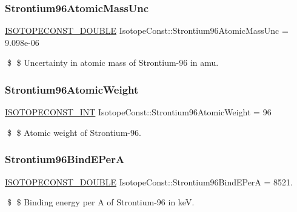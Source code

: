 \subsubsection{\texorpdfstring{Strontium96\+Atomic\+Mass\+Unc}{Strontium96AtomicMassUnc}}
{\footnotesize\ttfamily \mbox{\hyperlink{group___isotope_const-_macros_ga8f45a7272ce02c0b4c65c44636ed719a}{I\+S\+O\+T\+O\+P\+E\+C\+O\+N\+S\+T\+\_\+\+D\+O\+U\+B\+LE}} Isotope\+Const\+::\+Strontium96\+Atomic\+Mass\+Unc = 9.\+098e-\/06}

\$ \$ Uncertainty in atomic mass of Strontium-\/96 in amu. \mbox{\label{group___isotope_const-_strontium-_sr96_gac4fa06fe18f748002ca7fe9cbf92f8d5}} 
\subsubsection{\texorpdfstring{Strontium96\+Atomic\+Weight}{Strontium96AtomicWeight}}
{\footnotesize\ttfamily \mbox{\hyperlink{group___isotope_const-_macros_ga5f18360b3e99483a35c32d789e62621c}{I\+S\+O\+T\+O\+P\+E\+C\+O\+N\+S\+T\+\_\+\+I\+NT}} Isotope\+Const\+::\+Strontium96\+Atomic\+Weight = 96}

\$ \$ Atomic weight of Strontium-\/96. \mbox{\label{group___isotope_const-_strontium-_sr96_ga03f3808d4b28e17a091509e330060e58}} 
\subsubsection{\texorpdfstring{Strontium96\+Bind\+E\+PerA}{Strontium96BindEPerA}}
{\footnotesize\ttfamily \mbox{\hyperlink{group___isotope_const-_macros_ga8f45a7272ce02c0b4c65c44636ed719a}{I\+S\+O\+T\+O\+P\+E\+C\+O\+N\+S\+T\+\_\+\+D\+O\+U\+B\+LE}} Isotope\+Const\+::\+Strontium96\+Bind\+E\+PerA = 8521.}

\$ \$ Binding energy per A of Strontium-\/96 in keV. \mbox{\label{group___isotope_const-_strontium-_sr96_gac2f92c97a34c2059afe1d3d9e8e96bf4}} 
